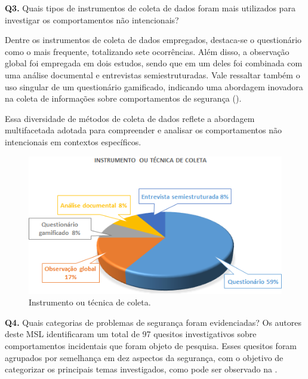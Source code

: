 \documentclass[portuguese]{textolivre}
\begin{document}
\textbf{Q3.} Quais tipos de instrumentos de coleta de dados foram mais utilizados para investigar os comportamentos não intencionais?

Dentre os instrumentos de coleta de dados empregados, destaca-se o questionário como o mais frequente, totalizando sete ocorrências. Além disso, a observação global foi empregada em dois estudos, sendo que em um deles foi combinada com uma análise documental e entrevistas semiestruturadas. Vale ressaltar também o uso singular de um questionário gamificado, indicando uma abordagem inovadora na coleta de informações sobre comportamentos de segurança ().

Essa diversidade de métodos de coleta de dados reflete a abordagem multifacetada adotada para compreender e analisar os comportamentos não intencionais em contextos específicos.

\begin{figure}[htbp]
\centering
\begin{minipage}{0.65\linewidth}
  \includegraphics[width=\linewidth]{Fig5.png}
  \caption{Instrumento ou técnica de coleta.}
  \label{fig5}
\end{minipage}
\end{figure}

\textbf{Q4.} Quais categorias de problemas de segurança foram evidenciadas?
Os autores deste MSL identificaram um total de 97 quesitos investigativos sobre comportamentos incidentais que foram objeto de pesquisa. Esses quesitos foram agrupados por semelhança em dez aspectos da segurança, com o objetivo de categorizar os principais temas investigados, como pode ser observado na .
\end{document}
